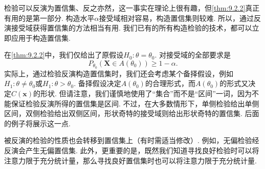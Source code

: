 检验可以反演为置信集、反之亦然，这一事实在理论上很有趣，但\autoref{thm:9.2.2}真正有用的是第一部分. 构造水平$\alpha$接受域相对容易，构造置信集则较难. 所以，通过反演接受域获得置信集的方法相当有用. 我们已有的所有构造检验的技术，都可以立即应用于构造置信集.

在\autoref{thm:9.2.2}中，我们仅给出了原假设$H_0:\theta=\theta_0$. 对接受域的全部要求是
$$P_{\theta_0}(\boldsymbol X\in A(\theta_0))\ge1-\alpha.$$
实际上，通过检验反演构造置信集时，我们还会考虑某个备择假设，例如$H_1:\theta\ne\theta_0$或$H_1:\theta>\theta_0$. 备择假设决定$A(\theta_0)$的合理形式，而$A(\theta_0)$的形式又决定$C(\boldsymbol x)$的形状. 但请注意，我们谨慎地使用了“集合”而不是“区间”一词，因为不能保证检验反演所得的置信集是区间. 不过，在大多数情形下，单侧检验给出单侧区间，双侧检验给出双侧区间，形状奇特的接受域则给出形状奇特的置信集. 后面的例子将展示这一点.

被反演的检验的性质也会转移到置信集上（有时需适当修改）. 例如，无偏检验经反演会产生无偏置信集. 此外，更重要的是，既然我们知道寻找良好检验时可以将注意力限于充分统计量，那么寻找良好置信集时也可以将注意力限于充分统计量.


